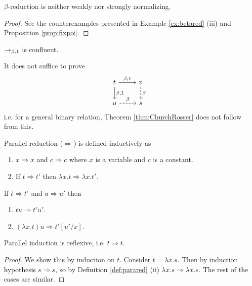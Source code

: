 \begin{rem}
    $\beta$-reduction is neither weakly nor strongly normalizing.
\end{rem}
\begin{proof}
    See the counterexamples presented in Example \ref{ex:betared} (iii) and Proposition \ref{prop:fixpoi}.
\end{proof}

\begin{boxthm} \label{thm:ChurchRosser}
    $\to_{\beta, 1}$ is confluent.
\end{boxthm}

\begin{rem}
    It does not suffice to prove
    \begin{equation*}
        \begin{tikzcd}
            t \ar[r, "{\beta, 1}"] \ar[d, "{\beta, 1}"] & v \ar[d, dashed, "\beta"] \\
            u \ar[r, dashed, "\beta"] & s
        \end{tikzcd}
    \end{equation*}
    i.e. for a general binary relation, Theorem \ref{thm:ChurchRosser} does not follow from this.
\end{rem}

\begin{boxdefi} \label{def:parared}
    \alert{Parallel reduction ($\Rightarrow$)} is defined inductively as
    \begin{enumerate}
        \item $x \Rightarrow x$ and $c \Rightarrow c$ where $x$ is a variable and $c$ is a constant.
        \item If $t \Rightarrow t'$ then $\lambda x.t \Rightarrow \lambda x. t'$.
    \end{enumerate}
    If $t \Rightarrow t'$ and $u \Rightarrow u'$ then
    \begin{enumerate}[resume]
        \item $tu \Rightarrow t'u'$.
        \item $(\lambda x.t)u \Rightarrow t'[u'/x]$.
    \end{enumerate}
\end{boxdefi}

\begin{boxlem}
    Parallel induction is reflexive, i.e. $t \Rightarrow t$.
\end{boxlem}
\begin{proof}
    We show this by induction on $t$.
    Consider $t = \lambda x.s$.
    Then by induction hypothesis $s \Rightarrow s$, so by Definition \ref{def:parared} (ii) $\lambda x.s \Rightarrow \lambda x.s$.
    The rest of the cases are similar.
\end{proof}

